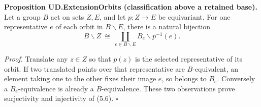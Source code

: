 \textbf{Proposition UD.ExtensionOrbits (classification above a retained
base).} Let a group \(B\) act on sets \(Z,E\), and let \(p:Z\to E\) be
equivariant. For one representative \(e\) of each orbit in
\(B\backslash E\), there is a natural bijection \[
B\backslash Z\ \cong\ \coprod_{e\in B\backslash E}B_e\backslash p^{-1}(e).
\tag{5.6}
\]

\emph{Proof.} Translate any \(z\in Z\) so that \(p(z)\) is the selected
representative of its orbit. If two translated points over that
representative are \(B\)-equivalent, an element taking one to the other
fixes their image \(e\), so belongs to \(B_e\). Conversely a
\(B_e\)-equivalence is already a \(B\)-equivalence. These two
observations prove surjectivity and injectivity of (5.6). \(\square\)
